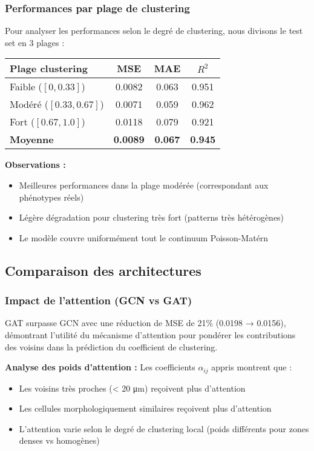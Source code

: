 \subsubsection{Performances par plage de clustering}

Pour analyser les performances selon le degré de clustering, nous divisons le test set en 3 plages :

\begin{center}
\begin{tabular}{|l|c|c|c|}
\hline
\textbf{Plage clustering} & \textbf{MSE} & \textbf{MAE} & \textbf{$R^2$} \\
\hline
Faible ($[0, 0.33]$) & 0.0082 & 0.063 & 0.951 \\
Modéré ($[0.33, 0.67]$) & 0.0071 & 0.059 & 0.962 \\
Fort ($[0.67, 1.0]$) & 0.0118 & 0.079 & 0.921 \\
\hline
\textbf{Moyenne} & \textbf{0.0089} & \textbf{0.067} & \textbf{0.945} \\
\hline
\end{tabular}
\end{center}

\textbf{Observations :}
\begin{itemize}
    \item Meilleures performances dans la plage modérée (correspondant aux phénotypes réels)
    \item Légère dégradation pour clustering très fort (patterns très hétérogènes)
    \item Le modèle couvre uniformément tout le continuum Poisson-Matérn
\end{itemize}

\subsection{Comparaison des architectures}

\subsubsection{Impact de l'attention (GCN vs GAT)}

GAT surpasse GCN avec une réduction de MSE de 21\% (0.0198 → 0.0156), démontrant l'utilité du mécanisme d'attention pour pondérer les contributions des voisins dans la prédiction du coefficient de clustering.

\textbf{Analyse des poids d'attention :}
Les coefficients $\alpha_{ij}$ appris montrent que :
\begin{itemize}
    \item Les voisins très proches (< 20 μm) reçoivent plus d'attention
    \item Les cellules morphologiquement similaires reçoivent plus d'attention
    \item L'attention varie selon le degré de clustering local (poids différents pour zones denses vs homogènes)
\end{itemize}

